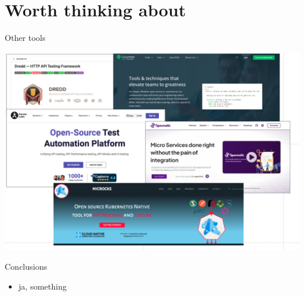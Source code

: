 	\section{Worth thinking about}

	\begin{frame}{Other tools}
		\begin{center}
			\includegraphics[width=.8\textwidth]{./assets/other_tools}
		\end{center}
	\end{frame}


	\begin{frame}{Conclusions}

		\begin{itemize}
			\item ja, something
		\end{itemize}

	\end{frame}


